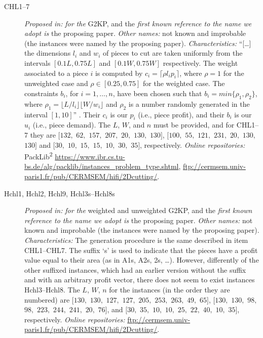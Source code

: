 \documentclass[ppgc,prop-tese,english,formais,babel]{iiufrgs}
\begin{document}
\begin{description}
\item [CHL1--7] \emph{Proposed in:} \citet{cung:2000} \emph{for the} G2KP, and the \emph{first known reference to the name we adopt is} the proposing paper. \emph{Other names: } not known and improbable (the instances were named by the proposing paper). \emph{Characteristics: } ``[\dots] the dimensions \(l_i\) and \(w_i\) of pieces to cut are taken uniformly from the intervals \([0.1L, 0.75L]\) and \([0.1W, 0.75W]\) respectively. The weight associated to a piece \(i\) is computed by \(c_i = \lceil\rho l_i p_i\rceil\), where \(\rho = 1\) for the unweighted case and \(\rho \in [0.25, 0.75]\) for the weighted case. The constraints \(b_i\), for \(i = 1, \dots, n\), have been chosen such that \(b_i = min\{\rho_1, \rho_2\}\), where \(\rho_1 = \lfloor L/l_i \rfloor\lfloor W/w_i \rfloor \) and \(\rho_2\) is a number randomly generated in the interval \([1, 10]\)'' \citep{cung:2000}. Their \(c_i\) is our \(p_i\) (i.e., piece profit), and their \(b_i\) is our \(u_i\) (i.e., piece demand). The \(L\), \(W\), and \(n\) must be provided, and for CHL1--7 they are \([132,\) \(62,\) \(157,\) \(207,\) \(20,\) \(130,\) \(130]\), \([100,\) \(55,\) \(121,\) \(231,\) \(20,\) \(130,\) \(130]\) and \([30,\) \(10,\) \(15,\) \(15,\) \(10,\) \(30,\) \(35]\), respectively. \emph{Online repositories:} PackLib\textsuperscript{2} \url{https://www.ibr.cs.tu-bs.de/alg/packlib/instances_problem_type.shtml}, \url{ftp://cermsem.univ-paris1.fr/pub/CERMSEM/hifi/2Dcutting/}.
\item [Hchl1, Hchl2, Hchl9, Hchl3s--Hchl8s] \emph{Proposed in:} \citet{cung:2000} \emph{for the} weighted and unweighted G2KP, and the \emph{first known reference to the name we adopt is} the proposing paper. \emph{Other names:} not known and improbable (the instances were named by the proposing paper). \emph{Characteristics: } The generation procedure is the same described in item CHL1--CHL7. The suffix `s' is used to indicate that the pieces have a profit value equal to their area (as in A1s, A2s, 2s, \dots). However, differently of the other suffixed instances, which had an earlier version without the suffix and with an arbitrary profit vector, there does not seem to exist instances Hchl3--Hchl8. The \(L\), \(W\), \(n\) for the instances (in the order they are numbered) are \([130,\) \(130,\) \(127,\) \(127,\) \(205,\) \(253,\) \(263,\) \(49,\) \(65]\), \([130,\) \(130,\) \(98,\) \(98,\) \(223,\) \(244,\) \(241,\) \(20,\) \(76]\), and \([30,\) \(35,\) \(10,\) \(10,\) \(25,\) \(22,\) \(40,\) \(10,\) \(35]\), respectively. \emph{Online repositories:} \url{ftp://cermsem.univ-paris1.fr/pub/CERMSEM/hifi/2Dcutting/}.

\end{description}
\end{document}
